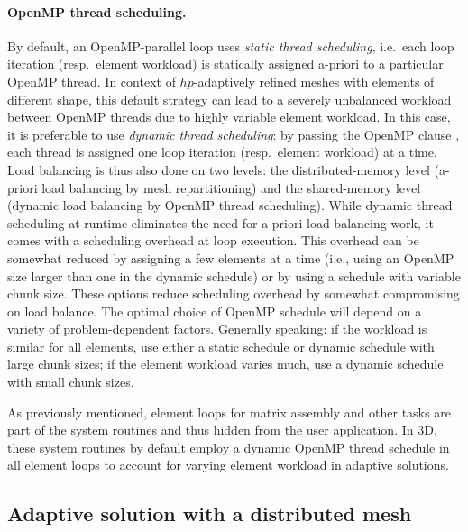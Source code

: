 \paragraph{OpenMP thread scheduling.}
By default, an OpenMP-parallel loop uses \emph{static thread scheduling}, i.e.~each loop iteration (resp.~element workload) is statically assigned a-priori to a particular OpenMP thread.
In context of $hp$-adaptively refined meshes with elements of different shape, this default strategy can lead to a severely unbalanced workload between OpenMP threads due to highly variable element workload. In this case, it is preferable to use \emph{dynamic thread scheduling}: by passing the OpenMP clause , each thread is assigned one loop iteration (resp.~element workload) at a time. Load balancing is thus also done on two levels: the distributed-memory level (a-priori load balancing by mesh repartitioning) and the shared-memory level (dynamic load balancing by OpenMP thread scheduling). While dynamic thread scheduling at runtime eliminates the need for a-priori load balancing work, it comes with a scheduling overhead at loop execution.
This overhead can be somewhat reduced by assigning a few elements at a time (i.e., using an OpenMP  size larger than one in the dynamic schedule) or by using a  schedule with variable chunk size. These options reduce scheduling overhead by somewhat compromising on load balance. The optimal choice of OpenMP schedule will depend on a variety of problem-dependent factors. Generally speaking: if the workload is similar for all elements, use either a static schedule or dynamic schedule with large chunk sizes; if the element workload varies much, use a dynamic schedule with small chunk sizes.

\begin{remark}
As previously mentioned, element loops for matrix assembly and other tasks are part of the system routines and thus hidden from the user application. In \hp3D, these system routines by default employ a dynamic OpenMP thread schedule in all element loops to account for varying element workload in adaptive solutions.
\end{remark}

\subsection{Adaptive solution with a distributed mesh}
\label{sec:parallel-adaptivity}

